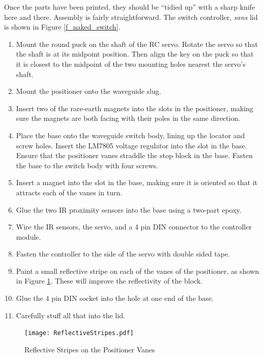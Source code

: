 \documentclass[12pt]{article}
\begin{document}
Once the parts have been printed, they should be ``tidied up'' with
a sharp knife here and there.  Assembly is fairly straightforward.
The switch controller, {\em sans} lid is shown in Figure \ref{f_naked_switch}.

\begin{enumerate}
\setlength\itemsep{0em}  
\item Mount the round puck on the shaft of the RC servo. Rotate the
  servo so that the shaft is at its midpoint position. Then align
  the key on the puck so that it is closest to the midpoint of the
  two mounting holes nearest the servo's shaft.
\item Mount the positioner onto the waveguide slug.
\item Insert two of the rare-earth magnets into the slots in
  the positioner, making sure the magnets are both facing with
  their poles in the same direction.
\item Place the base onto the waveguide switch body, lining up
  the locator and screw holes. Insert the LM7805 voltage regulator
  into the slot in the base. Ensure that the positioner vanes
  straddle the stop block in the base. Fasten the base to the
  switch body with four screws.
\item Insert a magnet into the slot in the base, making sure
  it is oriented so that it attracts each of the vanes in turn.
\item Glue the two IR proximity sensors into the base using
  a two-part epoxy.
\item Wire the IR sensors, the servo, and a 4 pin DIN connector
  to the controller module.
\item Fasten the controller to the side of the servo with
  double sided tape.
\item Paint a small reflective stripe on each of the vanes of the
  positioner, as shown in Figure \ref{f_positioner_stripe}.
  These will improve the reflectivity of the block. 
\item Glue the 4 pin DIN socket into the hole at one end
  of the base.
  \item Carefully stuff all that into the lid. 
  \end{enumerate}


\begin{figure}[tb]
  \centering
  \texttt{[image: ReflectiveStripes.pdf]}
  \caption{\label{f_positioner_stripe}Reflective Stripes on the Positioner Vanes}
\end{figure}
\end{document}
